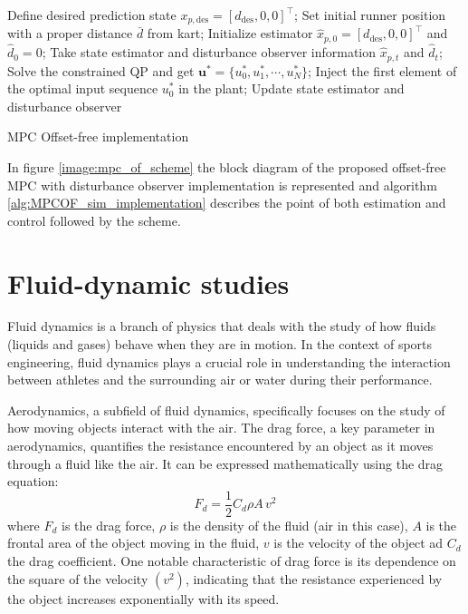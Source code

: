 \documentclass[a4paper,12pt,oneside]{book}
\begin{document}
\begin{algorithm}
\begin{algorithmic}[1]
	\State Define desired prediction state $x_{p,\text{des}} = [d_{\text{des}}, 0, 0]^\top$;
	\State Set initial runner position with a proper distance $\bar{d}$ from kart;
	\State Initialize estimator $\hat{x}_{p,0} = [d_{\text{des}}, 0, 0]^\top$ and $\hat{d}_0 = 0$;
		\State Take state estimator and disturbance observer information $\hat{x}_{p,t}$ and $\hat{d}_t$;
		\State Solve the constrained QP and get $\boldsymbol{u}^* = \{u_0^*, u_1^*, \cdots, u_N^*\}$; 
		\State Inject the first element of the optimal input sequence $u_0^*$ in the plant;
		\State Update state estimator and disturbance observer 
	\EndFor
\caption{MPC Offset-free implementation}
\label{alg:MPCOF_sim_implementation}
\end{algorithmic}
\end{algorithm}

\bigskip
In figure \ref{image:mpc_of_scheme} the block diagram of the proposed offset-free MPC with disturbance observer implementation is represented and algorithm \ref{alg:MPCOF_sim_implementation} describes the point of both estimation and control followed by the scheme.

\newpage
\section{Fluid-dynamic studies}

Fluid dynamics is a branch of physics that deals with the study of how fluids (liquids and gases) behave when they are in motion.
In the context of sports engineering, fluid dynamics plays a crucial role in understanding the interaction between athletes and the surrounding air or water during their performance.

Aerodynamics, a subfield of fluid dynamics, specifically focuses on the study of how moving objects interact with the air. 
The drag force, a key parameter in aerodynamics, quantifies the resistance encountered by an object as it moves through a fluid like the air. 
It can be expressed mathematically using the drag equation:
\begin{equation}
	F_d = \frac{1}{2} C_d \rho A \, v^2
\end{equation}
where $F_d$ is the drag force, $\rho$ is the density of the fluid (air in this case), $A$ is the frontal area of the object moving in the fluid, 
$v$ is the velocity of the object ad $C_d$ the drag coefficient.
One notable characteristic of drag force is its dependence on the square of the velocity $(v^2)$, indicating that the resistance experienced by the object increases exponentially with its speed. 
\end{document}
